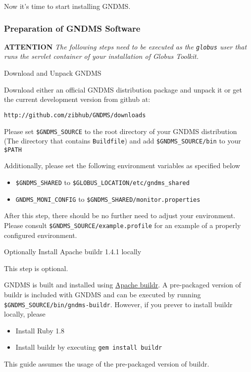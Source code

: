 \documentclass{article}
\begin{document}
Now it's time to start installing GNDMS.

\subsubsection{Preparation of GNDMS Software}

\textbf{ATTENTION}
\emph{The following steps need to be executed as the \texttt{globus} user that runs the servlet container of your installation of Globus Toolkit.}

Download and Unpack GNDMS

Download either an official GNDMS distribution package and unpack
it or get the current development version from github at:

  \verb!http://github.com/zibhub/GNDMS/downloads!

Please set \verb!$GNDMS_SOURCE! to the root directory of your GNDMS
distribution (The directory that contains \verb!Buildfile!) and add
\verb!$GNDMS_SOURCE/bin! to your \verb!$PATH!

Additionally, please set the following environment variables as specified below

\begin{itemize}
\item
  \verb!$GNDMS_SHARED! to \verb!$GLOBUS_LOCATION/etc/gndms_shared!
\item
  \verb!GNDMS_MONI_CONFIG! to \verb!$GNDMS_SHARED/monitor.properties!
\end{itemize}

After this step, there should be no further need to adjust your
environment. Please consult \verb!$GNDMS_SOURCE/example.profile!
for an example of a properly configured environment.

Optionally Install Apache buildr 1.4.1 locally

This step is optional.

GNDMS is built and installed using
\href{http:///buildr.apache.org}{Apache buildr}. A pre-packaged
version of buildr is included with GNDMS and can be executed by
running \verb!$GNDMS_SOURCE/bin/gndms-buildr!. However, if you
prever to install buildr locally, please

\begin{itemize}
\item
  Install Ruby 1.8
\item
  Install buildr by executing \verb!gem install buildr!
\end{itemize}
This guide assumes the usage of the pre-packaged version of
buildr.
\end{document}
